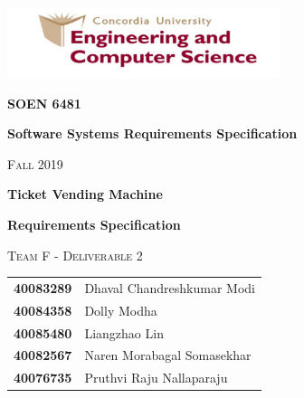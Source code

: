 \documentclass[15pt]{article}
\begin{document}
\begin{titlepage}

\addtolength{\hoffset}{-0.1cm}
	\centering
	\includegraphics[width=0.60\textwidth]{logo.png}\par\vspace{1.5cm}
	{\huge\bfseries SOEN 6481 \par}
	{\huge\bfseries Software Systems Requirements Specification \par}
	{\scshape\LARGE Fall 2019 \par}
	\vspace{1cm}
	\vspace{1.5cm}
	{\huge\bfseries Ticket Vending Machine \par}
	{\huge\bfseries Requirements Specification \par}
	\vspace{1cm}
	{\scshape\LARGE Team F - Deliverable 2\par}

	\vspace{0.5cm}
	\begin{tabular}{ c l }
	\vspace{0.2cm}
	{\Large\bfseries 40083289 \par} & {\Large Dhaval Chandreshkumar Modi \par}\\
	\vspace{0.2cm}
	{\Large\bfseries 40084358 \par} & {\Large Dolly Modha  \par}\\
	\vspace{0.2cm}
	{\Large\bfseries 40085480 \par} & {\Large Liangzhao Lin  \par}\\
	\vspace{0.2cm}
	{\Large\bfseries 40082567 \par} & {\Large Naren Morabagal Somasekhar \par}\\
	\vspace{0.2cm}
	{\Large\bfseries 40076735 \par} & {\Large Pruthvi Raju Nallaparaju \par}\\
	\end{tabular}
	\vspace{0.5cm}


\end{titlepage}
\end{document}
